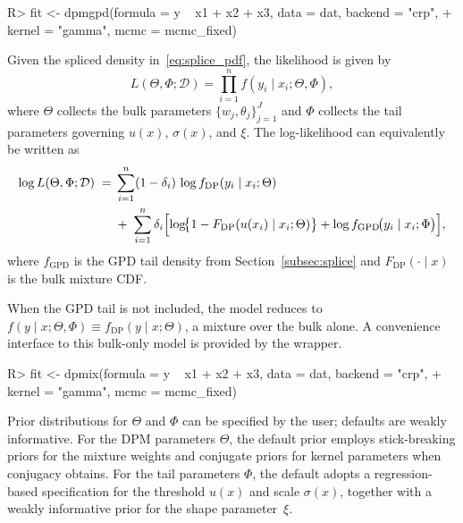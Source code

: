 \documentclass[article]{jss}\usepackage[]{graphicx}\usepackage[]{xcolor}
\renewenvironment{Schunk}{\vspace{0pt}}{\vspace{-0.1\baselineskip}}
\begin{document}
\begin{Schunk}
\begin{Sinput}
R> fit <- dpmgpd(formula = y ~ x1 + x2 + x3, data = dat, backend = "crp",
+                kernel = "gamma", mcmc = mcmc_fixed)
\end{Sinput}
\end{Schunk}

Given the spliced density in~\eqref{eq:splice_pdf}, the likelihood is given by
\begin{equation}
  L(\Theta,\Phi;\mathcal{D})
  =\prod_{i=1}^n f(y_i\mid x_i;\Theta,\Phi),
  \label{eq:overview-lik}
\end{equation}
where $\Theta$ collects the bulk parameters
$\{w_j,\theta_j\}_{j=1}^J$ and $\Phi$ collects the tail parameters
governing $u(x)$, $\sigma(x)$, and $\xi$.  The log-likelihood can
equivalently be written as
\begin{align*}
  \log L(\Theta,\Phi;\mathcal{D})
  \;=&\;\sum_{i=1}^n (1-\delta_i)\,\log f_{\mathrm{DP}}(y_i\mid x_i;\Theta)
  \\
  &\;+\;\sum_{i=1}^n \delta_i
  \Bigl[
    \log\!\bigl\{1-F_{\mathrm{DP}}(u(x_i)\mid x_i;\Theta)\bigr\}
    +\log f_{\mathrm{GPD}}\!\bigl(y_i\mid x_i;\Phi\bigr)
  \Bigr],
\end{align*}
where $f_{\mathrm{GPD}}$ is the GPD tail density from
Section~\ref{subsec:splice} and $F_{\mathrm{DP}}(\cdot\mid x)$ is the
bulk mixture CDF.

When the GPD tail is not included, the model reduces to
$f(y\mid x;\Theta, \Phi) \equiv f_{\text{DP}}(y \mid x; \Theta)$, a
mixture over the bulk alone.  A convenience interface to this bulk-only
model is provided by the  wrapper.

\begin{Schunk}
\begin{Sinput}
R> fit <- dpmix(formula = y ~ x1 + x2 + x3, data = dat, backend = "crp",
+                  kernel = "gamma",  mcmc = mcmc_fixed)
\end{Sinput}
\end{Schunk}

Prior distributions for $\Theta$ and $\Phi$ can be specified by the
user; defaults are weakly informative.  For the DPM parameters
$\Theta$, the default prior employs stick-breaking priors for the
mixture weights and conjugate priors for kernel parameters when
conjugacy obtains.  For the tail parameters $\Phi$, the default adopts
a regression-based specification for the threshold $u(x)$ and scale
$\sigma(x)$, together with a weakly informative prior for the shape
parameter~$\xi$.
\end{document}
